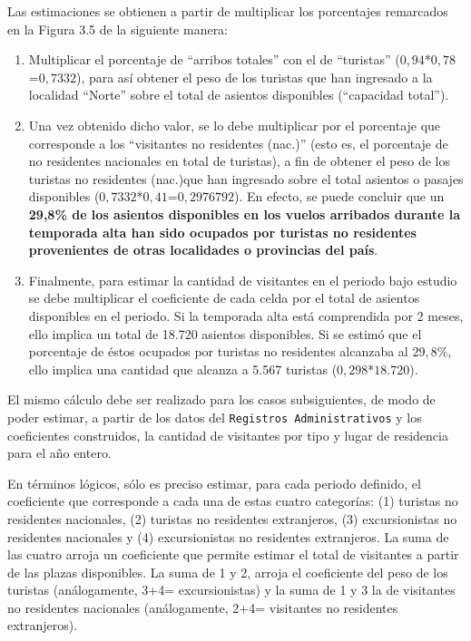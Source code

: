 \documentclass[
]{book}
\begin{document}
Las estimaciones se obtienen a partir de multiplicar los porcentajes remarcados en la Figura 3.5 de la siguiente manera:\\

\begin{enumerate}
\def\labelenumi{\arabic{enumi}.}
\item
  Multiplicar el porcentaje de ``arribos totales'' con el de ``turistas'' (\(0,94\)*\(0,78\)=\(0,7332\)), para así obtener el peso de los turistas que han ingresado a la localidad ``Norte'' sobre el total de asientos disponibles (``capacidad total'').
\item
  Una vez obtenido dicho valor, se lo debe multiplicar por el porcentaje que corresponde a los ``visitantes no residentes (nac.)'' (esto es, el porcentaje de no residentes nacionales en total de turistas), a fin de obtener el peso de los turistas no residentes (nac.)que han ingresado sobre el total asientos o pasajes disponibles (\(0,7332\)*\(0,41\)=\(0,2976792\)). En efecto, se puede concluir que un \textbf{29,8\% de los asientos disponibles en los vuelos arribados durante la temporada alta han sido ocupados por turistas no residentes provenientes de otras localidades o provincias del país}.
\item
  Finalmente, para estimar la cantidad de visitantes en el periodo bajo estudio se debe multiplicar el coeficiente de cada celda por el total de asientos disponibles en el periodo. Si la temporada alta está comprendida por 2 meses, ello implica un total de 18.720 asientos disponibles. Si se estimó que el porcentaje de éstos ocupados por turistas no residentes alcanzaba al \(29,8\%\), ello implica una cantidad que alcanza a 5.567 turistas (\(0,298\)*\(18.720\)).
\end{enumerate}

El mismo cálculo debe ser realizado para los casos subsiguientes, de modo de poder estimar, a partir de los datos del \texttt{Registros\ Administrativos} y los coeficientes construidos, la cantidad de visitantes por tipo y lugar de residencia para el año entero.

En términos lógicos, sólo es preciso estimar, para cada periodo definido, el coeficiente que corresponde a cada una de estas cuatro categorías: (1) turistas no residentes nacionales, (2) turistas no residentes extranjeros, (3) excursionistas no residentes nacionales y (4) excursionistas no residentes extranjeros. La suma de las cuatro arroja un coeficiente que permite estimar el total de visitantes a partir de las plazas disponibles. La suma de 1 y 2, arroja el coeficiente del peso de los turistas (análogamente, 3+4= excursionistas) y la suma de 1 y 3 la de visitantes no residentes nacionales (análogamente, 2+4= visitantes no residentes extranjeros).
\end{document}
